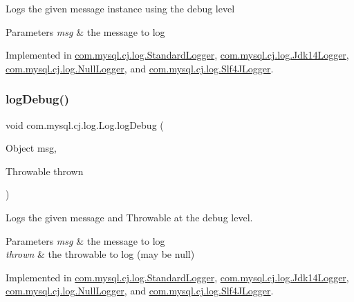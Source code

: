 Logs the given message instance using the \textquotesingle{}debug\textquotesingle{} level


\begin{DoxyParams}{Parameters}
{\em msg} & the message to log \\
\hline
\end{DoxyParams}


Implemented in \mbox{\hyperlink{classcom_1_1mysql_1_1cj_1_1log_1_1_standard_logger_a99571fed95c82bb8356f213c3a4b0fa8}{com.\+mysql.\+cj.\+log.\+Standard\+Logger}}, \mbox{\hyperlink{classcom_1_1mysql_1_1cj_1_1log_1_1_jdk14_logger_a9675c51be991227aaa6d395fb618eef2}{com.\+mysql.\+cj.\+log.\+Jdk14\+Logger}}, \mbox{\hyperlink{classcom_1_1mysql_1_1cj_1_1log_1_1_null_logger_ae46ab625efa73570bb45757cacdf32f4}{com.\+mysql.\+cj.\+log.\+Null\+Logger}}, and \mbox{\hyperlink{classcom_1_1mysql_1_1cj_1_1log_1_1_slf4_j_logger_aef79b4ff2ba3058fe4f713db62707e6c}{com.\+mysql.\+cj.\+log.\+Slf4\+J\+Logger}}.

\mbox{\label{interfacecom_1_1mysql_1_1cj_1_1log_1_1_log_a42c9900bc643b771d7e337686ac4f799}} 
\subsubsection{\texorpdfstring{log\+Debug()}{logDebug()}\hspace{0.1cm}{\footnotesize\ttfamily [2/2]}}
{\footnotesize\ttfamily void com.\+mysql.\+cj.\+log.\+Log.\+log\+Debug (\begin{DoxyParamCaption}\item[{Object}]{msg,  }\item[{Throwable}]{thrown }\end{DoxyParamCaption})}

Logs the given message and Throwable at the \textquotesingle{}debug\textquotesingle{} level.


\begin{DoxyParams}{Parameters}
{\em msg} & the message to log \\
\hline
{\em thrown} & the throwable to log (may be null) \\
\hline
\end{DoxyParams}


Implemented in \mbox{\hyperlink{classcom_1_1mysql_1_1cj_1_1log_1_1_standard_logger_a8f641c61351e0b4242bc14c49d72f603}{com.\+mysql.\+cj.\+log.\+Standard\+Logger}}, \mbox{\hyperlink{classcom_1_1mysql_1_1cj_1_1log_1_1_jdk14_logger_a3be3b804fac31009afe4dcbc9a399027}{com.\+mysql.\+cj.\+log.\+Jdk14\+Logger}}, \mbox{\hyperlink{classcom_1_1mysql_1_1cj_1_1log_1_1_null_logger_aafdb325726af974c0ebfd5c134e934e4}{com.\+mysql.\+cj.\+log.\+Null\+Logger}}, and \mbox{\hyperlink{classcom_1_1mysql_1_1cj_1_1log_1_1_slf4_j_logger_aeaf3ce8432b63f1b631e7ad698ea7aa6}{com.\+mysql.\+cj.\+log.\+Slf4\+J\+Logger}}.

